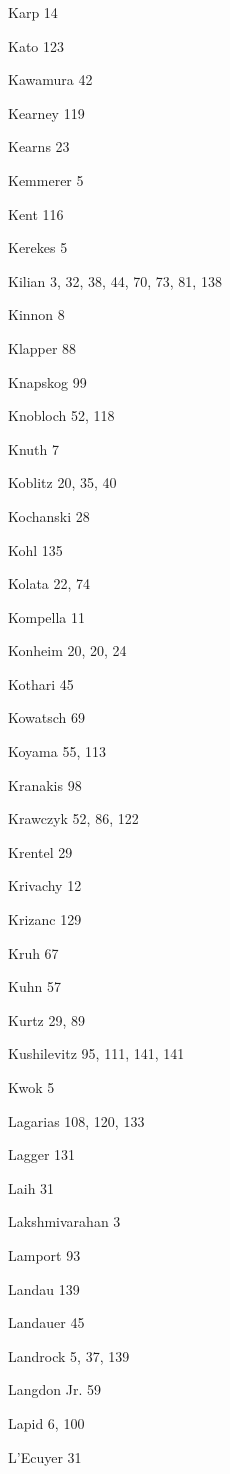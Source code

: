 \begin{theindex}
\item Karp 14
\item Kato 123
\item Kawamura 42
\item Kearney 119
\item Kearns 23
\item Kemmerer 5
\item Kent 116
\item Kerekes 5
\item Kilian 3, 32, 38, 44, 70, 73, 81, 138
\item Kinnon 8
\item Klapper 88
\item Knapskog 99
\item Knobloch 52, 118
\item Knuth 7
\item Koblitz 20, 35, 40
\item Kochanski 28
\item Kohl 135
\item Kolata 22, 74
\item Kompella 11
\item Konheim 20, 20, 24
\item Kothari 45
\item Kowatsch 69
\item Koyama 55, 113
\item Kranakis 98
\item Krawczyk 52, 86, 122
\item Krentel 29
\item Krivachy 12
\item Krizanc 129
\item Kruh 67
\item Kuhn 57
\item Kurtz 29, 89
\item Kushilevitz 95, 111, 141, 141
\item Kwok 5
\item Lagarias 108, 120, 133
\item Lagger 131
\item Laih 31
\item Lakshmivarahan 3
\item Lamport 93
\item Landau 139
\item Landauer 45
\item Landrock 5, 37, 139
\item {Langdon Jr.} 59
\item Lapid 6, 100
\item L'Ecuyer 31

\end{theindex}
